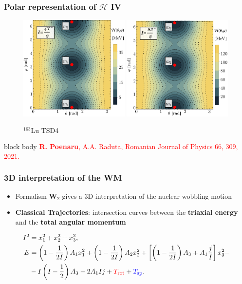 \documentclass{beamer}
\begin{document}
\begin{frame}
	\frametitle{Polar representation of $\mathcal{H}$ IV}
	\vspace{-1cm}
	\begin{figure}
		\centering
		\caption{$^{163}$Lu TSD4}
		\includegraphics[width=0.49\textwidth]{figures/parity-partners-plots/contour-tsd4-1.pdf}
		\includegraphics[width=0.49\textwidth]{figures/parity-partners-plots/contour-tsd4-2.pdf}
	\end{figure}
	\begin{beamercolorbox}[rounded=true,shadow=false, wd=\linewidth,]{block body}
		\centering
		\textcolor{red}{\footnotesize{\textbf{R. Poenaru}, A.A. Raduta, Romanian Journal of Physics 66, 309, 2021.}}
	\end{beamercolorbox}
\end{frame}

\begin{frame}
	\frametitle{3D interpretation of the WM}
	\begin{itemize}
		\item Formalism $\mathbf{W}_2$ gives a 3D interpretation of the nuclear wobbling motion
		\item \textbf{Classical Trajectories}: intersection curves between the \textbf{triaxial energy} and the \textbf{total angular momentum}
	\end{itemize}
	\begin{align}
		I^2&=x_1^2+x_2^2+x_3^2,\nonumber\\
		E&=\left(1-\frac{1}{2I}\right)A_1x_1^2+\left(1-\frac{1}{2I}\right)A_2x_2^2+\left[\left(1-\frac{1}{2I}\right)A_3+A_1\frac{j}{I}\right]x_3^2-\nonumber\\
		&-I\left(I-\frac{1}{2}\right)A_3-2A_1Ij+{\color{red}T_\text{rot}}+{\color{blue}T_\text{sp}}.\nonumber
	\end{align}
\end{frame}
\end{document}
